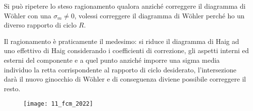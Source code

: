\documentclass{article}
\begin{document}
\begin{adjustwidth}{2in}{}
			Si può ripetere lo steso ragionamento qualora anziché correggere il diagramma di Wöhler con una $\sigma_m\ne0$, volessi correggere il diagramma di Wöhler perché ho un diverso rapporto di ciclo $R$. 
			
			Il ragionamento è praticamente il medesimo: si riduce il diagramma di Haig ad uno effettivo di Haig considerando i coefficienti di correzione, gli aspetti interni ed esterni del componente e a quel punto anziché imporre una sigma media individuo la retta corrispondente al rapporto di ciclo desiderato, l'intersezione darà il nuovo ginocchio di Wöhler e di conseguenza diviene possibile correggere il resto.
		\end{adjustwidth}
		\begin{figure}[H]
		\texttt{[image: 11\_fcm\_2022]}
		\end{figure}
\end{document}
